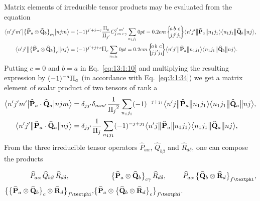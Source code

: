 Matrix elements of irreducible tensor products may be evaluated from the equation
\begin{align}
\braOket{n^{\prime} j^{\prime} m^{\prime}}{\bigl\{\widehat{\mathbf{P}}_{a} \otimes \widehat{\mathbf{Q}}_{b}\bigr\}_{c\gamma}}{n j m}&
=(-1)^{j^{\prime}+j-c} \frac{\Fact{c}}{\Fact{j^{\prime}}}
\clebsch{j}{m}{c}{\gamma}{j^{\prime}}{m^{\prime}}
\sum_{n_{1} j_{1}}
\sixj{a}{b}{c}{j}{j^\prime}{j_1}
\braOketred{n^\prime j^{\prime}}{\widehat{\mathbf{P}}_{a}}{n_{1} j_{1}}
\braOketred{n_{1} j_{1}}{\widehat{\mathbf{Q}}_{b}}{n j} , \label{eq:13:1:10}\\
\braOketred{n^{\prime} j^{\prime}}{\bigl\{\widehat{\mathbf{P}}_{a} \otimes \widehat{\mathbf{Q}}_{b}\bigr\}_{c}}{n j }&
=(-1)^{j^{\prime}+j+c} \Fact{c} 
\sum_{n_{1} j_{1}}
\sixj{a}{b}{c}{j}{j^\prime}{j_1}
\braOketred{n^\prime j^{\prime}}{\widehat{\mathbf{P}}_{a}}{n_{1} j_{1}}
\braOketred{n_{1} j_{1}}{\widehat{\mathbf{Q}}_{b}}{n j} . \notag
\end{align}
Putting \(c=0\) and \(b=a\) in Eq.~\eqref{eq:13:1:10} and multiplying the resulting expression by \((-1)^{-a} \Fact{a}\) (in accordance with Eq.~\eqref{eq:3:1:34}) we get a matrix element of scalar product of two tensors of rank a
\begin{align}
\braOket{n^{\prime} j^{\prime} m^{\prime}}{\widehat{\mathbf{P}}_{a} \cdot \widehat{\mathbf{Q}}_{a}}{n j m}
&=\delta_{j j^{\prime}} \delta_{m m^{\prime}} \frac{1}{\Fact{j}^{2}} \sum_{n_{1} j_{1}}(-1)^{-j+j_{1}}
\braOketred{n^\prime j}{\widehat{\mathbf{P}}_{a}}{n_{1} j_{1}}
\braOketred{n_{1} j_{1}}{\widehat{\mathbf{Q}}_{a}}{n j} , \label{eq:13:1:11}\\
\braOketred{n^{\prime} j^{\prime}}{\widehat{\mathbf{P}}_{a} \cdot \widehat{\mathbf{Q}}_{a}}{n j}
&=\delta_{j j^{\prime}} \frac{1}{\Fact{j}} \sum_{n_{1} j_{1}}(-1)^{-j+j_{1}}
\braOketred{n^\prime j}{\widehat{\mathbf{P}}_{a}}{n_{1} j_{1}}
\braOketred{n_{1} j_{1}}{\widehat{\mathbf{Q}}_{a}}{n j} ,\notag
\end{align}
From the three irreducible tensor operators \(\widehat{P}_{a \alpha}\), \(\widehat{Q}_{b \beta}\) and \(\widehat{R}_{d \delta}\), one can compose the products
\begin{equation*}
\begin{array}{ccc}
\widehat{P}_{a \alpha} \, \widehat{Q}_{b \beta} \, \widehat{R}_{d \delta}, & \bigl\{\widehat{\vect{P}}_{a} \otimes \widehat{\mathbf{Q}}_{b}\bigr\}_{c \gamma} \, \widehat{R}_{d \delta}, & \widehat{P}_{a \alpha} \,\bigl\{\widehat{\mathbf{Q}}_{b} \otimes \widehat{\vect{R}}_{d}\bigr\}_{f \varphi}, \\
\bigl\{\bigl\{\widehat{\vect{P}}_{a} \otimes \widehat{\mathbf{Q}}_{b}\bigr\}_{c} \otimes \widehat{\vect{R}}_{d}\bigr\}_{f\varphi}, & \bigl\{\widehat{\vect{P}}_{a} \otimes\bigl\{\widehat{\mathbf{Q}}_{b} \otimes \widehat{\vect{R}}_{d}\bigr\}_{c}\bigr\}_{f \varphi} .
\end{array}
\end{equation*}

